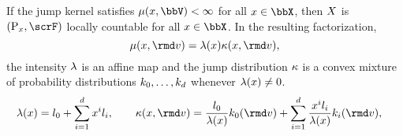 \begin{proposition}
  \label{proposition:locally-countable}
  If the jump kernel satisfies $\affJump(\stateVar, \vecSpace) < \infty$ for all $\stateVar \in \stateSpace$, then $X$ is $(\Prb_\stateVar, \scrF)$ locally countable for all $\stateVar \in \stateSpace$.
  In the resulting factorization,
  \begin{equation*}
    \affJump(\stateVar, \rmd\markVar) = \affInt(\stateVar) \affDist(\stateVar, \rmd\markVar),
  \end{equation*}
  the intensity $\lambda$ is an affine map and the jump distribution $\kappa$ is a convex mixture of probability distributions $k_0, \ldots, k_d$ whenever $\lambda(x) \neq 0$.
  \begin{equation*}
    \affInt(\stateVar) = \affIntPart_0 + \sum_{i=1}^d \stateVar^i \affIntPart_i, \qquad \affDist(\stateVar, \rmd\markVar) = \frac{\affIntPart_0}{\affInt(\stateVar)} \affDistPart_0(\rmd\markVar) + \sum_{i=1}^d \frac{\stateVar^i\affIntPart_i}{\affInt(\stateVar)} \affDistPart_i(\rmd\markVar), \quad 
  \end{equation*}
\end{proposition}
